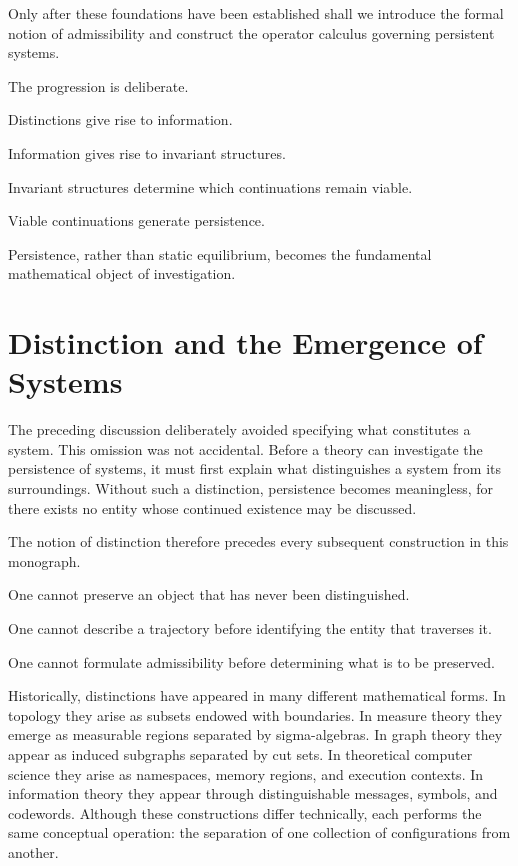 \documentclass[11pt]{book}
\numberwithin{equation}{chapter}
\theoremstyle{definition}
\theoremstyle{plain}
\begin{document}
Only after these foundations have been established shall we introduce the formal notion of admissibility and construct the operator calculus governing persistent systems.

The progression is deliberate.

Distinctions give rise to information.

Information gives rise to invariant structures.

Invariant structures determine which continuations remain viable.

Viable continuations generate persistence.

Persistence, rather than static equilibrium, becomes the fundamental mathematical object of investigation.

\section{Distinction and the Emergence of Systems}

The preceding discussion deliberately avoided specifying what constitutes a system. This omission was not accidental. Before a theory can investigate the persistence of systems, it must first explain what distinguishes a system from its surroundings. Without such a distinction, persistence becomes meaningless, for there exists no entity whose continued existence may be discussed.

The notion of distinction therefore precedes every subsequent construction in this monograph.

One cannot preserve an object that has never been distinguished.

One cannot describe a trajectory before identifying the entity that traverses it.

One cannot formulate admissibility before determining what is to be preserved.

Historically, distinctions have appeared in many different mathematical forms. In topology they arise as subsets endowed with boundaries. In measure theory they emerge as measurable regions separated by sigma-algebras. In graph theory they appear as induced subgraphs separated by cut sets. In theoretical computer science they arise as namespaces, memory regions, and execution contexts. In information theory they appear through distinguishable messages, symbols, and codewords. Although these constructions differ technically, each performs the same conceptual operation: the separation of one collection of configurations from another.
\end{document}
